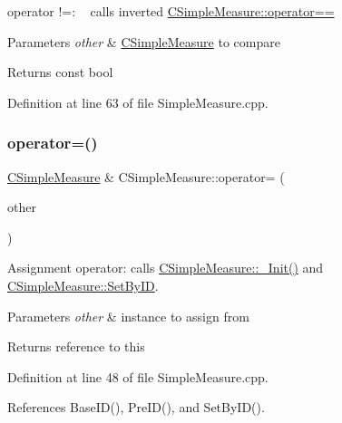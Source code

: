 operator !=\+: ~\newline
 calls inverted \hyperlink{classCSimpleMeasure_aafe9d3871eadf4004a62a8561b883b1e}{C\+Simple\+Measure\+::operator==} 


\begin{DoxyParams}{Parameters}
{\em other} & \hyperlink{classCSimpleMeasure}{C\+Simple\+Measure} to compare \\
\hline
\end{DoxyParams}
\begin{DoxyReturn}{Returns}
const bool 
\end{DoxyReturn}


Definition at line 63 of file Simple\+Measure.\+cpp.

\mbox{\label{classCSimpleMeasure_a8466a492481648fa96a734566f0d6ba5}} 
\subsubsection{\texorpdfstring{operator=()}{operator=()}}
{\footnotesize\ttfamily \hyperlink{classCSimpleMeasure}{C\+Simple\+Measure} \& C\+Simple\+Measure\+::operator= (\begin{DoxyParamCaption}\item[{const \hyperlink{classCSimpleMeasure}{C\+Simple\+Measure} \&}]{other }\end{DoxyParamCaption})}



Assignment operator\+: calls \hyperlink{classCSimpleMeasure_ada8744ac5a824143904a2ecaef2b0b70}{C\+Simple\+Measure\+::\+\_\+\+Init()} and \hyperlink{classCSimpleMeasure_a6945aa333dca5623482d38cd9a7e3225}{C\+Simple\+Measure\+::\+Set\+By\+ID}. 


\begin{DoxyParams}{Parameters}
{\em other} & instance to assign from \\
\hline
\end{DoxyParams}
\begin{DoxyReturn}{Returns}
reference to this 
\end{DoxyReturn}


Definition at line 48 of file Simple\+Measure.\+cpp.



References Base\+I\+D(), Pre\+I\+D(), and Set\+By\+I\+D().


